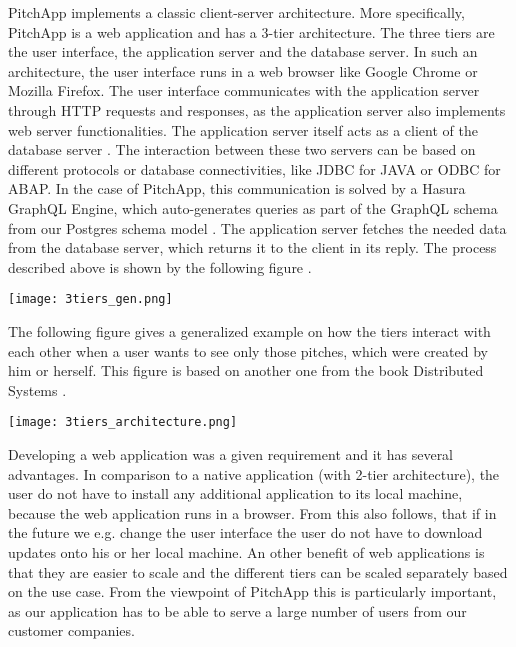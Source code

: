PitchApp implements a classic client-server architecture. More specifically, PitchApp is a web application and has a 3-tier architecture. The three tiers are the user interface, the application server and the database server. In such an architecture, the user interface runs in a web browser like Google Chrome or Mozilla Firefox. The user interface communicates with the application server through HTTP requests and responses, as the application server also implements web server functionalities. The application server itself acts as a client of the database server \parencite[p.~80]{MT17}. The interaction between these two servers can be based on different protocols or database connectivities, like JDBC for JAVA or ODBC for ABAP. In the case of PitchApp, this communication is solved by a Hasura GraphQL Engine, which auto-generates queries as part of the GraphQL schema from our Postgres schema model \parencite{Hasura}. The application server fetches the needed data from the database server, which returns it to the client in its reply. The process described above is shown by the following figure \parencite[p.~80]{MT17}.

\begin{center}
\texttt{[image: 3tiers\_gen.png]}
\end{center}

\break

The following figure gives a generalized example on how the tiers interact with each other when a user wants to see only those pitches, which were created by him or herself. This figure is based on another one from the book Distributed Systems \parencite[p.~61]{MT17}.

\begin{center}
	\texttt{[image: 3tiers\_architecture.png]}
\end{center}

Developing a web application was a given requirement and it has several advantages. In comparison to a native application (with 2-tier architecture), the user do not have to install any additional application to its local machine, because the web application runs in a browser. From this also follows, that if in the future we e.g. change the user interface the user do not have to download updates onto his or her local machine. An other benefit of web applications is that they are easier to scale and the different tiers can be scaled separately based on the use case. From the viewpoint of PitchApp this is particularly important, as our application has to be able to serve a large number of users from our customer companies.

